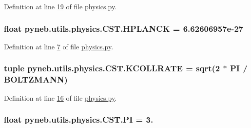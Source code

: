 Definition at line \hyperlink{physics_8py_source_l00019}{19} of file \hyperlink{physics_8py_source}{physics.\-py}.

\hypertarget{classpyneb_1_1utils_1_1physics_1_1_c_s_t_a00251eede3f56eadeb766c97f3144c55}{
\subsubsection[{H\-P\-L\-A\-N\-C\-K}]{\setlength{\rightskip}{0pt plus 5cm}float pyneb.\-utils.\-physics.\-C\-S\-T.\-H\-P\-L\-A\-N\-C\-K = 6.\-62606957e-\/27\hspace{0.3cm}{\ttfamily [static]}}}\label{classpyneb_1_1utils_1_1physics_1_1_c_s_t_a00251eede3f56eadeb766c97f3144c55}


Definition at line \hyperlink{physics_8py_source_l00007}{7} of file \hyperlink{physics_8py_source}{physics.\-py}.

\hypertarget{classpyneb_1_1utils_1_1physics_1_1_c_s_t_a7f947f81f3596cb129cec85e6ecb78e7}{
\subsubsection[{K\-C\-O\-L\-L\-R\-A\-T\-E}]{\setlength{\rightskip}{0pt plus 5cm}tuple pyneb.\-utils.\-physics.\-C\-S\-T.\-K\-C\-O\-L\-L\-R\-A\-T\-E = sqrt(2 $\ast$ {\bf P\-I} / {\bf B\-O\-L\-T\-Z\-M\-A\-N\-N})\hspace{0.3cm}{\ttfamily [static]}}}\label{classpyneb_1_1utils_1_1physics_1_1_c_s_t_a7f947f81f3596cb129cec85e6ecb78e7}


Definition at line \hyperlink{physics_8py_source_l00016}{16} of file \hyperlink{physics_8py_source}{physics.\-py}.

\hypertarget{classpyneb_1_1utils_1_1physics_1_1_c_s_t_adeb7151ce462944ff7a0ff2803f873c3}{
\subsubsection[{P\-I}]{\setlength{\rightskip}{0pt plus 5cm}float pyneb.\-utils.\-physics.\-C\-S\-T.\-P\-I = 3.\hspace{0.3cm}{\ttfamily [static]}}}\label{classpyneb_1_1utils_1_1physics_1_1_c_s_t_adeb7151ce462944ff7a0ff2803f873c3}


